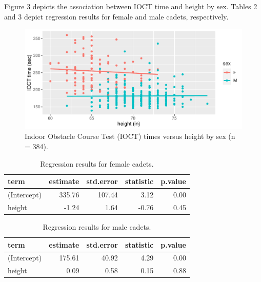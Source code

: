 \documentclass[]{book}
\begin{document}
\vspace{1in}

\newpage

Figure 3 depicts the association between IOCT time and height by sex. Tables 2 and 3 depict regression results for female and male cadets, respectively.

\begin{figure}
\centering
\includegraphics{MA206supplement_files/figure-latex/unnamed-chunk-18-1.pdf}
\caption{\label{fig:unnamed-chunk-18}Indoor Obstacle Course Test (IOCT) times versus height by sex (n = 384).}
\end{figure}

\begin{table}

\caption{\label{tab:unnamed-chunk-19}Regression results for female cadets.}
\centering
\begin{tabular}[t]{l|r|r|r|r}
\hline
term & estimate & std.error & statistic & p.value\\
\hline
(Intercept) & 335.76 & 107.44 & 3.12 & 0.00\\
\hline
height & -1.24 & 1.64 & -0.76 & 0.45\\
\hline
\end{tabular}
\end{table}

\begin{table}

\caption{\label{tab:unnamed-chunk-19}Regression results for male cadets.}
\centering
\begin{tabular}[t]{l|r|r|r|r}
\hline
term & estimate & std.error & statistic & p.value\\
\hline
(Intercept) & 175.61 & 40.92 & 4.29 & 0.00\\
\hline
height & 0.09 & 0.58 & 0.15 & 0.88\\
\hline
\end{tabular}
\end{table}
\end{document}
